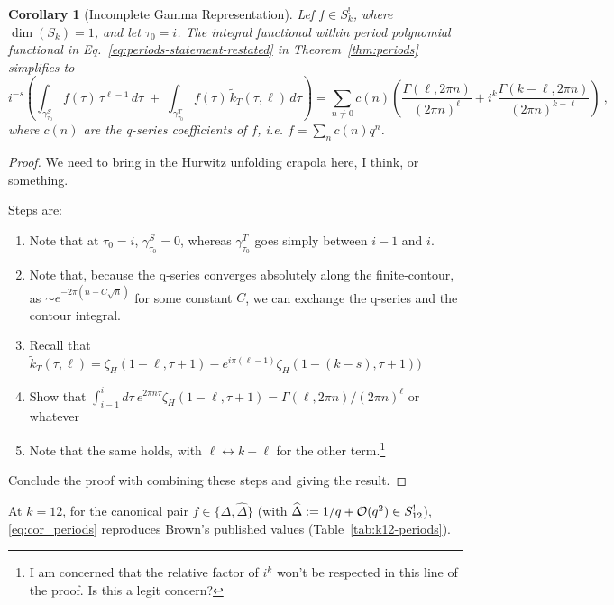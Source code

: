 \documentclass[11pt]{article}
\newtheorem{corollary}[theorem]{Corollary}
\numberwithin{equation}{section}  %
\newcommand{\Dhat}{\widehat{\Delta}}
\begin{document}
\begin{corollary}[Incomplete Gamma Representation]\label{cor:periods}
Lef $f \in S_k^!$, where $\dim(S_k)=1$, and let $\tau_0 = i$. The integral
functional within period polynomial functional in Eq.~\eqref{eq:periods-statement-restated} 
in Theorem~\ref{thm:periods} simplifies to
\begin{equation}\label{eq:cor_periods}
    i^{-s}\left(\int_{\gamma^S_{\tau_0}}\!\! f(\tau)\,\tau^{\ell - 1}\,d\tau
    \;+\;
    \int_{\gamma^T_{\tau_0}}\!\! f(\tau)\,\widetilde{k}_T(\tau, \ell)\,d\tau\right)
    = \sum_{n \neq 0} c(n) \left(\frac{\Gamma(\ell, 2 \pi n)}{(2\pi n)^\ell}+ i^k \frac{\Gamma(k-\ell, 2\pi n)}{(2 \pi n)^{k-\ell}}\right)~,
\end{equation}
where $c(n)$ are the q-series coefficients of $f$, i.e. $f = \sum_n c(n) q^n$.
\end{corollary}
\begin{proof}
We need to bring in the Hurwitz unfolding crapola here, I think, or something.

Steps are:
\begin{enumerate}
\item Note that at $\tau_0 = i$, $\gamma^S_{\tau_0} = 0$, whereas $\gamma^T_{\tau_0}$ goes simply between $i-1$ and $i$.
\item Note that, because the q-series converges absolutely along the finite-contour, as $\sim e^{-2 \pi (n - C \sqrt{n})}$ for some constant $C$, we can exchange the q-series and the contour integral. 
\item Recall that $\widetilde{k}_T(\tau, \ell) = \zeta_H(1-\ell, \tau+1) - e^{i \pi (\ell-1)} \zeta_H(1-(k-s), \tau+1))$
\item Show that $\int_{i-1}^i d\tau~e^{2 \pi n \tau} \zeta_H(1-\ell, \tau+1) = \Gamma(\ell, 2 \pi n)/(2\pi n)^\ell$ or whatever
\item Note that the same holds, with $\ell \leftrightarrow k-\ell$ for the other term.\footnote{I am concerned that the relative factor of $i^k$ won't be respected in this line of the proof. Is this a legit concern?}
\end{enumerate}
Conclude the proof with combining these steps and giving the result.
\end{proof}
At $k = 12$, for the canonical pair $f \in \{\Delta, \Dhat\}$ (with
$\Dhat := 1/q + {\cal O}(q^2) \in S_{12}^!$), \eqref{eq:cor_periods}
reproduces Brown's published values \cite{Brown2017} (Table~\ref{tab:k12-periods}).
\end{document}
